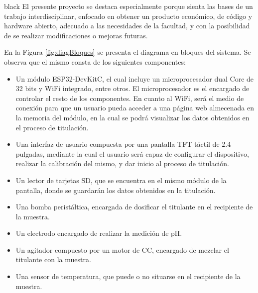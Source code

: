 \documentclass[11pt]{charter}
\begin{document}
\begin{consigna}{black}
El presente proyecto se destaca especialmente porque sienta las bases de un trabajo interdisciplinar, enfocado en obtener un producto económico, de código y hardware abierto, adecuado a las necesidades de la facultad, y con la posibilidad de se realizar modificaciones o mejoras futuras.


En la Figura \ref{fig:diagBloques} se presenta el diagrama en bloques del sistema. Se observa que el mismo consta de los siguientes componentes:
\begin{itemize}
\item Un módulo ESP32-DevKitC, el cual incluye un microprocesador dual Core de 32 bits y WiFi integrado, entre otros. El microprocesador es el encargado de controlar el resto de los componentes. En cuanto al WiFi, será el medio de conexión para que un usuario pueda acceder a una página web almecenada en la memoria del módulo, en la cual se podrá visualizar los datos obtenidos en el proceso de titulación.
\item Una interfaz de usuario compuesta por una pantalla TFT táctil de 2.4 pulgadas, mediante la cual el usuario será capaz de configurar el dispositivo, realizar la calibración del mismo, y dar inicio al proceso de titulación.
\item Un lector de tarjetas SD, que se encuentra en el mismo módulo de la pantalla, donde se guardarán los datos obtenidos en la titulación.
\item Una bomba peristáltica, encargada de dosificar el titulante en el recipiente de la muestra.
\item Un electrodo encargado de realizar la medición de pH.
\item Un agitador compuesto por un motor de CC, encargado de mezclar el titulante con la muestra.
\item Una sensor de temperatura, que puede o no situarse en el recipiente de la muestra.
\end{itemize}


\vspace{25px}


\end{consigna}
\end{document}
